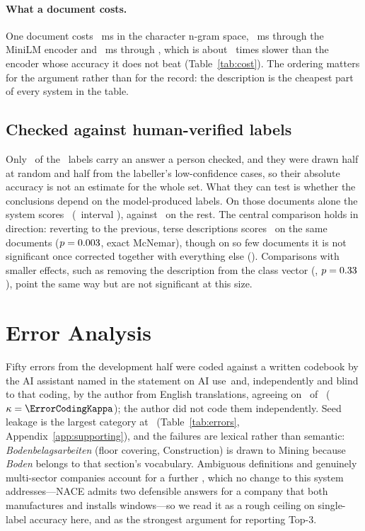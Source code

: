 \documentclass[11pt]{article}
\begin{document}
\paragraph{What a document costs.}
\label{sec:cost}
One document costs \BenchCharMs~ms in the character n-gram space,
\BenchMiniLMMs~ms through the MiniLM encoder and \BenchLLMMs~ms through
\LLMModel, which is about \BenchLLMTimes\ times slower than the encoder whose
accuracy it does not beat (Table~\ref{tab:cost}). The ordering matters for
the argument rather than for the record: the description is the cheapest part of
every system in the table.

\subsection{Checked against human-verified labels}
\label{sec:verified}

Only \VerifyN\ of the \NEVAL\ labels carry an answer a person checked, and they
were drawn half at random and half from the labeller's low-confidence cases, so
their absolute accuracy is not an estimate for the whole set. What they can
test is whether the conclusions depend on the model-produced labels. On those
documents alone the system scores \VerifiedTopOne\ (\CILevel\ interval
\VerifiedTopOneCI), against \RestTopOne\ on the rest. The central comparison
holds in direction: reverting to the previous, terse descriptions scores
\VerifiedOldTaxTopOne\ on the same documents ($p = 0.003$, exact
McNemar), though on so few documents it is not significant once corrected
together with everything else (\HolmVerifiedStat). Comparisons with smaller
effects, such as removing the description from the class vector
(\VerifiedNoDescTopOne, $p = 0.33$), point the
same way but are not significant at this size.

\section{Error Analysis}

Fifty errors from the development half were coded against a written codebook by
the AI assistant named in the statement on AI use\ifdefined\ErrorCodingKappa\
and, independently and blind to that coding, by the author from English
translations, agreeing on \ErrorCodingAgree\ of \ErrorCodingN\
($\kappa = \ErrorCodingKappa$)\else; the author did not code them
independently\fi. Seed leakage is the largest category at \SeedLeakShare\
(Table~\ref{tab:errors}, Appendix~\ref{app:supporting}), and the failures are
lexical rather than semantic: \emph{Bodenbelagsarbeiten} (floor covering,
Construction) is drawn to Mining because \emph{Boden} belongs to that section's
vocabulary. Ambiguous definitions and genuinely multi-sector companies account
for a further \AmbigMultiShare, which no change to this system addresses---NACE
admits two defensible answers for a company that both manufactures and installs
windows---so we read it as a rough ceiling on single-label accuracy here, and as
the strongest argument for reporting Top-3.
\end{document}
